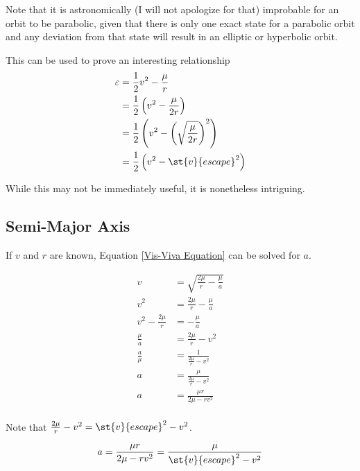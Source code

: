 \documentclass[../basicOrbitalDynamics.tex]{subfiles}
\begin{document}
Note that it is astronomically (I will not apologize for that) improbable for an orbit to be parabolic, given that there is only one exact state for a parabolic orbit and any deviation from that state will result in an elliptic or hyperbolic orbit.

This can be used to prove an interesting relationship
\begin{align*}
    \varepsilon & = \frac{1}{2}v^2-\frac{\mu}{r}                                     \\
                & = \frac{1}{2}\left(v^2-\frac{\mu}{2r}\right)                       \\
                & = \frac{1}{2}\left(v^2-\left(\sqrt{\frac{\mu}{2r}}\right)^2\right) \\
                & = \frac{1}{2}\left(v^2-\st{v}{escape}^2\right)                    \\
\end{align*}

While this may not be immediately useful, it is nonetheless intriguing.

\bigskip\bigskip
\subsection{Semi-Major Axis}\label{sec:SMA in Terms of V,R}

If $v$ and $r$ are known, Equation \eqref{Vis-Viva Equation} can be solved for $a$.

\begin{align*}
    v                  & = \sqrt{\frac{2\mu}{r}-\frac{\mu}{a}} \\
    v^2                & = \frac{2\mu}{r}-\frac{\mu}{a}        \\
    v^2-\frac{2\mu}{r} & =-\frac{\mu}{a}                       \\
    \frac{\mu}{a}      & = \frac{2\mu}{r}-v^2                  \\
    \frac{a}{\mu}      & = \frac{1}{\frac{2\mu}{r}-v^2}        \\
    a                  & = \frac{\mu}{\frac{2\mu}{r}-v^2}      \\
    a                  & = \frac{\mu r}{2\mu-rv^2}             \\
\end{align*}

Note that $\frac{2\mu}{r}-v^2=\st{v}{escape}^2-v^2$.

\begin{equation}\label{SMA in terms of r, v}
    a=\frac{\mu r}{2\mu-rv^2}=\frac{\mu}{\st{v}{escape}^2-v^2}
\end{equation}
\end{document}

